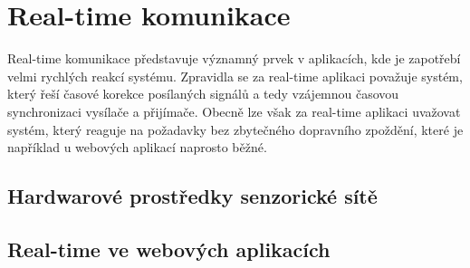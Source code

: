 \chapter{Real-time komunikace}
Real-time komunikace představuje významný prvek v aplikacích, kde je zapotřebí velmi rychlých reakcí systému. Zpravidla se za real-time aplikaci považuje systém, který řeší časové korekce posílaných signálů a tedy vzájemnou časovou synchronizaci vysílače a přijímače. Obecně lze však za real-time aplikaci uvažovat systém, který reaguje na požadavky bez zbytečného dopravního zpoždění, které je například u webových aplikací naprosto běžné.

\section{Hardwarové prostředky senzorické sítě}

\section{Real-time ve webových aplikacích}